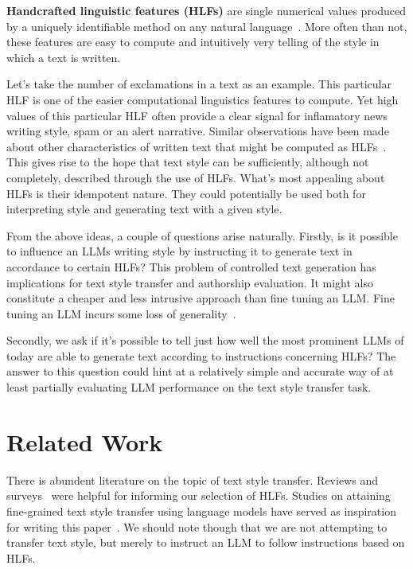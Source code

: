 \documentclass[runningheads,a4paper,11pt]{article}
\begin{document}
\textbf{Handcrafted linguistic features (HLFs)} are single numerical values produced by a
uniquely identifiable method on any natural language~\cite{lftk-2023}. More
often than not, these features are easy to compute and intuitively very telling
of the style in which a text is written.

Let's take the number of exclamations in a text as an example.
This particular HLF is one of the easier computational linguistics features to
compute.
Yet high values of this particular HLF often provide a clear signal for
inflamatory news writing style, spam or an alert narrative.
Similar observations have been made about other characteristics of written text
that might be computed as HLFs~\cite{hovy1987generating}.
This gives rise to the hope that text style can be sufficiently, although not
completely, described through the use of HLFs.
What's most appealing about HLFs is their idempotent nature.
They could potentially be used both for interpreting style and generating text
with a given style.

From the above ideas, a couple of questions arise naturally.
Firstly, is it possible to influence an LLMs writing style by instructing it to
generate text in accordance to certain HLFs?
This problem of controlled text generation has implications for text style
transfer and authorship evaluation.
It might also constitute a cheaper and less intrusive approach than fine tuning
an LLM.
Fine tuning an LLM incurs some loss of generality~\cite{yang2024unveiling}.

Secondly, we ask if it's possible to tell just how well the most prominent LLMs
of today are able to generate text according to instructions concerning HLFs?
The answer to this question could hint at a relatively simple and accurate way
of at least partially evaluating LLM performance on the text style transfer
task.

\section{Related Work}\label{related}

There is abundent literature on the topic of text style transfer.
Reviews and surveys~\cite{tst-review-2021,tst-survey-2022} were helpful for
informing our selection of HLFs.
Studies on attaining fine-grained text style transfer using language models
have served as inspiration for writing this paper~\cite{lyu-etal-2023-fine}.
We should note though that we are not attempting to transfer text style, but
merely to instruct an LLM to follow instructions based on HLFs.
\end{document}
